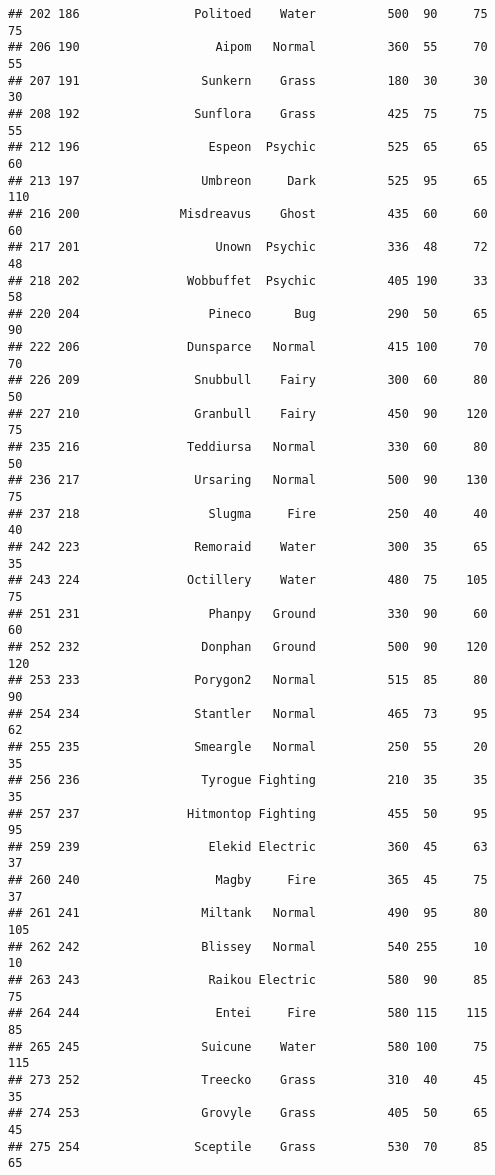 \documentclass[
]{article}
\begin{document}
\begin{verbatim}
## 202 186                Politoed    Water          500  90     75      75
## 206 190                   Aipom   Normal          360  55     70      55
## 207 191                 Sunkern    Grass          180  30     30      30
## 208 192                Sunflora    Grass          425  75     75      55
## 212 196                  Espeon  Psychic          525  65     65      60
## 213 197                 Umbreon     Dark          525  95     65     110
## 216 200              Misdreavus    Ghost          435  60     60      60
## 217 201                   Unown  Psychic          336  48     72      48
## 218 202               Wobbuffet  Psychic          405 190     33      58
## 220 204                  Pineco      Bug          290  50     65      90
## 222 206               Dunsparce   Normal          415 100     70      70
## 226 209                Snubbull    Fairy          300  60     80      50
## 227 210                Granbull    Fairy          450  90    120      75
## 235 216               Teddiursa   Normal          330  60     80      50
## 236 217                Ursaring   Normal          500  90    130      75
## 237 218                  Slugma     Fire          250  40     40      40
## 242 223                Remoraid    Water          300  35     65      35
## 243 224               Octillery    Water          480  75    105      75
## 251 231                  Phanpy   Ground          330  90     60      60
## 252 232                 Donphan   Ground          500  90    120     120
## 253 233                Porygon2   Normal          515  85     80      90
## 254 234                Stantler   Normal          465  73     95      62
## 255 235                Smeargle   Normal          250  55     20      35
## 256 236                 Tyrogue Fighting          210  35     35      35
## 257 237               Hitmontop Fighting          455  50     95      95
## 259 239                  Elekid Electric          360  45     63      37
## 260 240                   Magby     Fire          365  45     75      37
## 261 241                 Miltank   Normal          490  95     80     105
## 262 242                 Blissey   Normal          540 255     10      10
## 263 243                  Raikou Electric          580  90     85      75
## 264 244                   Entei     Fire          580 115    115      85
## 265 245                 Suicune    Water          580 100     75     115
## 273 252                 Treecko    Grass          310  40     45      35
## 274 253                 Grovyle    Grass          405  50     65      45
## 275 254                Sceptile    Grass          530  70     85      65

\end{verbatim}
\end{document}
